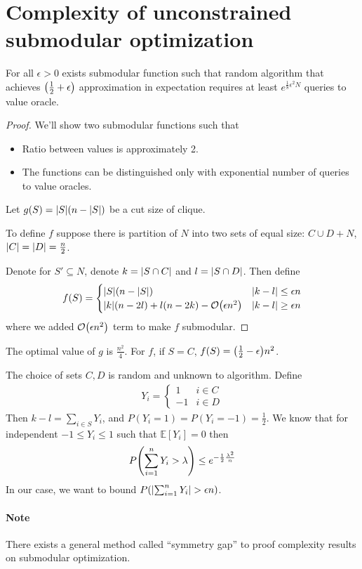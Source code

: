 \section{Complexity of unconstrained submodular optimization}
\begin{theorem}
	For all $\epsilon>0$ exists submodular function such that random algorithm that achieves  $\qty(\frac{1}{2}+\epsilon)$ approximation in expectation requires at least $e^{\frac{1}{8}\epsilon^2 N}$ queries to value oracle.
	\begin{proof}
		We'll show two submodular functions such that
		\begin{itemize}
			\item Ratio between values is approximately 2.
			\item The functions can be distinguished only with exponential number of queries to value oracles.
		\end{itemize}
	
	Let $g(S) = \abs{S} \qty(n-\abs{S})$ be a cut size of clique.
	
	To define $f$ suppose there is partition of $N$ into two sets of equal size: $C\cup D+N$, $\abs{C}=\abs{D}=\frac{n}{2}$. 
	
	Denote for $S'\subseteq N$, denote  $k=\abs{S\cap C}$ and $l=\abs{S\cap D}$. Then define
	\begin{align}
	f(S) = \begin{cases}
	\abs{S} \qty(n-\abs{S}) & \abs{k-l} \leq \epsilon n\\
	\abs{k} \qty(n-2l) + l(n-2k) - \order{\epsilon n^2}& \abs{k-l} \geq \epsilon n\\
	\end{cases}
	\end{align}
	where we added $\order{\epsilon n^2}$ term to make $f$ submodular.
	\end{proof}

	The optimal value of $g$ is $\frac{n^2}{4}$. For $f$, if $S=C$, $f(S)=\qty(\frac{1}{2}-\epsilon)n^2$.
	
	The choice of sets $C,D$ is random and unknown to algorithm. Define 
	\begin{align}
	Y_i = \begin{cases}
	1 & i\in C\\
	-1 & i\in D
	\end{cases}
	\end{align}
	Then $k-l = \sum_{i \in S} Y_i$, and $P(Y_i=1)=P(Y_i=-1)=\frac{1}{2}$. We know that for independent $-1\leq Y_i\leq 1$ such that $\mathbb{E} [Y_i] = 0$ then
	\begin{align}
		P\qty(\sum_{i =1}^n Y_i > \lambda) \leq e^{-\frac{1}{2}\frac{\lambda^2}{n}}
	\end{align}
	In our case, we want to bound $P\qty(\abs{\sum_{i =1}^n Y_i} > \epsilon n)$.
\end{theorem}

\paragraph{Note} There exists a general method called ``symmetry gap'' \cite{vondrak2013symmetry} to proof complexity results on submodular optimization.